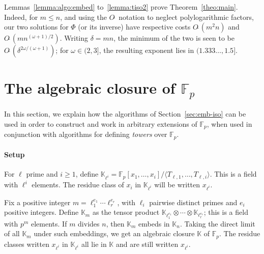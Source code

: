 \documentclass{sig-alternate}
\def\F {\ensuremath{\mathbb{F}}}
\def\K {\ensuremath{\mathbb{K}}}
\newcounter{algo}
\begin{document}
 Lemmas~\ref{lemma:algo:embed}
to~\ref{lemma:tiso2} prove Theorem~\ref{theo:main}. Indeed, for $m \le
n$, and using the $O\tilde{~}$ notation to neglect polylogarithmic
factors, our two solutions for $\Phi$ (or its inverse) have respective
costs $O\tilde{~}(m^2 n)$ and $O\tilde{~}(m
n^{(\omega+1)/2})$. Writing $\delta=mn$, the minimum of the two is
seen to be $O\tilde{~}(\delta^{2\omega/(\omega+1)})$; for $\omega \in
(2,3]$, the resulting exponent lies in $(1.333\dots, 1.5]$.



\section{The algebraic closure of $\F_p$}

In this section, we explain how the algorithms of
Section~\ref{sec:emb-iso} can be used in order to construct and work
in arbitrary extensions of $\F_p$, when used in conjunction with 
algorithms for defining {\em towers} over $\F_p$.



\paragraph*{{\bf \rm Setup}} For $\ell$ prime and $i \ge 1$, define
$\K_{\ell^i}=\F_p[x_1,\dots,x_i]/\langle
T_{\ell,1},\dots,T_{\ell,i}\rangle$. This is a field with $\ell^i$
elements.  The residue class of $x_i$ in $\K_{\ell^i}$ will be written
$x_{\ell^i}$.

Fix a positive integer $m=\ell_1^{e_1}\cdots \ell_r^{e_r}$, with
$\ell_i$ pairwise distinct primes and $e_i$ positive integers.  Define
$\K_m$ as the tensor product $\K_{\ell_1^{e_1}} \otimes \cdots \otimes
\K_{\ell_r^{e_r}}$; this is a field with $p^m$ elements.  If $m$
divides $n$, then $\K_m$ embeds in $\K_n$. Taking the direct limit of
all $\K_m$ under such embeddings, we get an algebraic closure $\K$ of
$\F_p$. The residue classes written $x_{\ell^i}$ in $\K_{\ell^i}$ all
lie in $\K$ and are still written $x_{\ell^i}$.
\end{document}
